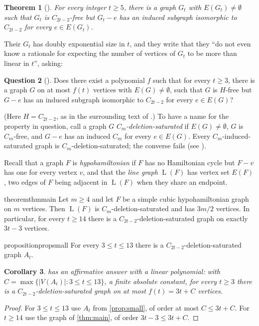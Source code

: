 \documentclass[11pt,a4paper]{article}
\theoremstyle{plain}
\newtheorem{theorem}{Theorem}[section]
\newtheorem{corollary}[theorem]{Corollary}
\theoremstyle{definition}
\newtheorem{question}[theorem]{Question}
\theoremstyle{remark}
\newcommand{\Ln}{\operatorname{L}}
\begin{document}
\begin{theorem}[{\cite[Theorem~1.6]{FHHS25}}]\label{thm:fhhs}
For every integer $t\ge5$, there is a graph $G_t$ with $E(G_t)\ne\emptyset$ such that $G_t$ is $C_{2t-2}$-free but $G_t-e$ has an induced subgraph isomorphic to $C_{2t-2}$ for every $e\in E(G_t)$.
\end{theorem}

Their $G_t$ has doubly exponential size in $t$, and they write that they ``do not even know a rationale for expecting the number of vertices of $G_t$ to be more than linear in $t$'', asking:

\begin{question}[{\cite[Question~1.8]{FHHS25}}]\label{q:18}
Does there exist a polynomial $f$ such that for every $t\ge3$, there is a graph $G$ on at most $f(t)$ vertices with $E(G)\ne\emptyset$, such that $G$ is $H$-free but $G-e$ has an induced subgraph isomorphic to $C_{2t-2}$ for every $e\in E(G)$?
\end{question}
(Here $H=C_{2t-2}$, as in the surrounding text of \cite{FHHS25}.) To have a name for the property in question, call a graph $G$ \emph{$C_m$-deletion-saturated} if $E(G)\ne\emptyset$, $G$ is $C_m$-free, and $G-e$ has an induced $C_m$ for every $e\in E(G)$. Every $C_m$-induced-saturated graph is $C_m$-deletion-saturated; the converse fails (see \cite[Figure~3]{FHHS25}).

Recall that a graph $F$ is \emph{hypohamiltonian} if $F$ has no Hamiltonian cycle but $F-v$ has one for every vertex $v$, and that the \emph{line graph} $\Ln(F)$ has vertex set $E(F)$, two edges of $F$ being adjacent in $\Ln(F)$ when they share an endpoint.

\begin{restatable}{theorem}{thmmain}\label{thm:main}
Let $m\ge4$ and let $F$ be a simple cubic hypohamiltonian graph on $m$ vertices. Then $\Ln(F)$ is $C_m$-deletion-saturated and has $3m/2$ vertices. In particular, for every $t\ge14$ there is a $C_{2t-2}$-deletion-saturated graph on exactly $3t-3$ vertices.
\end{restatable}

\begin{restatable}{proposition}{propsmall}\label{prop:small}
For every $3\le t\le13$ there is a $C_{2t-2}$-deletion-saturated graph $A_t$.
\end{restatable}

\begin{corollary}\label{cor:18}
 has an affirmative answer with a linear polynomial: with $C=\max\{|V(A_t)|:3\le t\le13\}$, a finite absolute constant, for every $t\ge3$ there is a $C_{2t-2}$-deletion-saturated graph on at most $f(t)=3t+C$ vertices.
\end{corollary}
\begin{proof}
For $3\le t\le13$ use $A_t$ from \cref{prop:small}, of order at most $C\le3t+C$. For $t\ge14$ use the graph of \cref{thm:main}, of order $3t-3\le3t+C$.
\end{proof}
\end{document}
